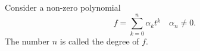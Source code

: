 Consider a non-zero polynomial
$$f = \sum_{k=0}^{n} \alpha_k t^k \quad \alpha_n \neq 0.$$
The number $n$ is called the degree of $f$.
